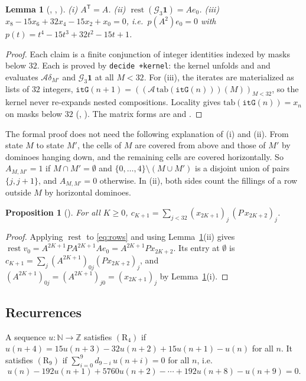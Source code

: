\documentclass[11pt]{amsart}
\theoremstyle{plain}
\newtheorem{lemma}[theorem]{Lemma}
\newtheorem{proposition}[theorem]{Proposition}
\theoremstyle{definition}
\newcommand{\N}{\mathbb{N}}
\newcommand{\Z}{\mathbb{Z}}
\newcommand{\rest}{\operatorname{rest}}
\newcommand{\cA}{\mathcal{A}}
\newcommand{\cG}{\mathcal{G}}
\newcommand{\one}{\mathbf{1}}
\begin{document}
\begin{lemma}[, , ]\label{lem:kernel}
\textup{(i)} $A^{\mathsf T}=A$. \textup{(ii)} $\rest(\cG_3\one)=Ae_0$. \textup{(iii)} $x_8-15x_6+32x_4-15x_2+x_0=0$, i.e.\ $p(A^2)e_0=0$ with $p(t)=t^4-15t^3+32t^2-15t+1$.
\end{lemma}

\begin{proof}
Each claim is a finite conjunction of integer identities indexed by masks below $32$. Each is proved by \texttt{decide +kernel}: the kernel unfolds  and  and evaluates $\cA\delta_{M'}$ and $\cG_3\one$ at all $M<32$. For (iii), the iterates are materialized as lists of $32$ integers, $\mathtt{itG}(n+1)=((\cA\,\mathrm{tab}(\mathtt{itG}(n)))(M))_{M<32}$, so the kernel never re-expands nested compositions. Locality gives $\mathrm{tab}(\mathtt{itG}(n))=x_n$ on masks below $32$ (, ). The matrix forms are  and .
\end{proof}

The formal proof does not need the following explanation of (i) and (ii). From state $M$ to state $M'$, the cells of $M$ are covered from above and those of $M'$ by dominoes hanging down, and the remaining cells are covered horizontally. So $A_{M,M'}=1$ if $M\cap M'=\emptyset$ and $\{0,\dots,4\}\setminus(M\cup M')$ is a disjoint union of pairs $\{j,j+1\}$, and $A_{M,M'}=0$ otherwise. In (ii), both sides count the fillings of a row outside $M$ by horizontal dominoes.

\begin{proposition}[]\label{prop:bilinear}
For all $K\ge0$, $c_{K+1}=\sum_{j<32}(x_{2K+1})_j\,(P\,x_{2K+2})_j$.
\end{proposition}

\begin{proof}
Applying $\rest$ to \eqref{eq:rows} and using Lemma~\ref{lem:kernel}(ii) gives $\rest v_0=A^{2K+1}PA^{2K+1}Ae_0=A^{2K+1}Px_{2K+2}$. Its entry at $\emptyset$ is $c_{K+1}=\sum_j(A^{2K+1})_{0j}(Px_{2K+2})_j$, and $(A^{2K+1})_{0j}=(A^{2K+1})_{j0}=(x_{2K+1})_j$ by Lemma~\ref{lem:kernel}(i).
\end{proof}

\subsection{Recurrences}
A sequence $u\colon\N\to\Z$ satisfies $(\mathrm{R}_4)$ if $u(n+4)=15u(n+3)-32u(n+2)+15u(n+1)-u(n)$ for all $n$. It satisfies $(\mathrm{R}_9)$ if $\sum_{i=0}^{9}d_{9-i}\,u(n+i)=0$ for all $n$, i.e.
\[
  u(n)-192u(n+1)+5760u(n+2)-\cdots+192u(n+8)-u(n+9)=0 .
\]
\end{document}
